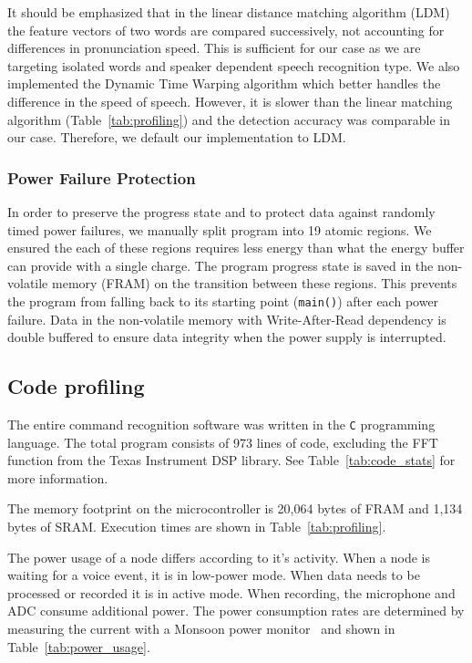 It should be emphasized that in the linear distance matching algorithm (LDM) the feature vectors of two words are compared successively, not accounting for differences in pronunciation speed. This is sufficient for our case as we are targeting isolated words and speaker dependent speech recognition type. We also implemented the Dynamic Time Warping algorithm which better handles the difference in the speed of speech. However, it is slower than the linear matching algorithm  (Table~\ref{tab:profiling}) and the detection accuracy was comparable in our case. Therefore, we default our implementation to LDM. 

\subsubsection{Power Failure Protection}
In order to preserve the progress state and to protect \cim data against randomly timed power failures, we manually split \cim program into 19 atomic regions. We ensured the each of these regions requires less energy than what the energy buffer can provide with a single charge. The program progress state is saved in the non-volatile memory (FRAM) on the transition between these regions. This prevents the program from falling back to its starting point (\texttt{main()}) after each power failure. Data in the non-volatile memory with Write-After-Read dependency is double buffered to ensure data integrity when the power supply is interrupted. 

\subsection{Code profiling}
The entire command recognition software was written in the {\tt C} programming language. The total program consists of 973 lines of code, excluding the FFT function from the Texas Instrument DSP library. See Table~\ref{tab:code_stats} for more information.

The memory footprint on the microcontroller is 20,064 bytes of FRAM and 1,134 bytes of SRAM. Execution times are shown in Table~\ref{tab:profiling}.

The power usage of a node differs according to it's activity. When a node is waiting for a voice event, it is in low-power mode. When data needs to be processed or recorded it is in active mode. When recording, the microphone and ADC consume additional power. The power consumption rates are determined by measuring the current with a Monsoon power monitor~\cite{monsoon} and shown in Table~\ref{tab:power_usage}.


